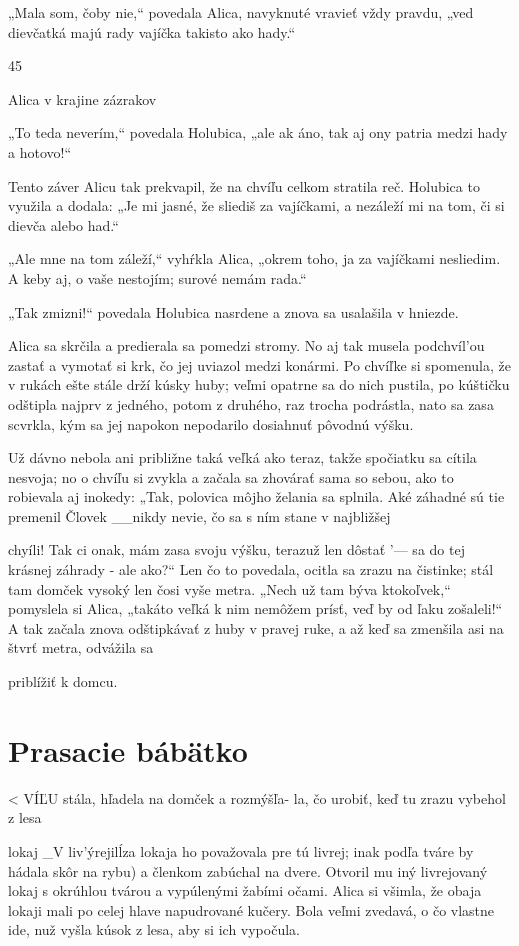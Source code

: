 \documentclass[12pt]{article}
\begin{document}
\begin{Parallel}[p]{}{}
{{„Mala som, čoby nie,“ povedala Alica, navyknuté vravieť
vždy pravdu, „ved dievčatká majú rady vajíčka takisto ako
hady.“

45

Alica v krajine zázrakov

„To teda neverím,“ povedala Holubica, „ale ak áno, tak
aj ony patria medzi hady a hotovo!“

Tento záver Alicu tak prekvapil, že na chvíľu celkom
stratila reč. Holubica to využila a dodala: „Je mi jasné, že
sliediš za vajíčkami, a nezáleží mi na tom, či si dievča alebo
had.“

„Ale mne na tom záleží,“ vyhŕkla Alica, „okrem toho, ja
za vajíčkami nesliedim. A keby aj, o vaše nestojím; surové
nemám rada.“

„Tak zmizni!“ povedala Holubica nasrdene a znova sa
usalašila v hniezde.

Alica sa skrčila a predierala sa pomedzi stromy. No aj tak
musela podchvíl'ou zastať a vymotať si krk, čo jej uviazol
medzi konármi. Po chvíľke si spomenula, že v rukách ešte
stále drží kúsky huby; veľmi opatrne sa do nich pustila, po
kúštičku odštipla najprv z jedného, potom z druhého, raz
trocha podrástla, nato sa zasa scvrkla, kým sa jej napokon
nepodarilo dosiahnuť pôvodnú výšku.

Už dávno nebola ani približne taká veľká ako teraz, takže
spočiatku sa cítila nesvoja; no o chvíľu si zvykla a začala sa
zhovárať sama so sebou, ako to robievala aj inokedy: „Tak,
polovica môjho želania sa splnila. Aké záhadné sú tie
premenil Človek __nikdy nevie, čo sa s ním stane v najbližšej

chyíli! Tak ci onak, mám zasa svoju výšku, terazuž len dôstať '—
sa do tej krásnej záhrady - ale ako?“ Len čo to povedala,
ocitla sa zrazu na čistinke; stál tam domček vysoký len čosi
vyše metra. „Nech už tam býva ktokoľvek,“ pomyslela si
Alica, „takáto veľká k nim nemôžem prísť, veď by od ľaku
zošaleli!“ A tak začala znova odštipkávať z huby v pravej
ruke, a až keď sa zmenšila asi na štvrť metra, odvážila sa

priblížiť k domcu.

\section{Prasacie bábätko}

< VÍĽU stála, hľadela na domček a rozmýšľa-
la, čo urobiť, keď tu zrazu vybehol z lesa

lokaj _V liv'ýrejilĺza lokaja ho považovala pre tú livrej; inak
podľa tváre by hádala skôr na rybu) a členkom zabúchal na
dvere. Otvoril mu iný livrejovaný lokaj s okrúhlou tvárou
a vypúlenými žabími očami. Alica si všimla, že obaja lokaji
mali po celej hlave napudrované kučery. Bola veľmi
zvedavá, o čo vlastne ide, nuž vyšla kúsok z lesa, aby si ich
vypočula.

}}
\end{Parallel}
\end{document}
